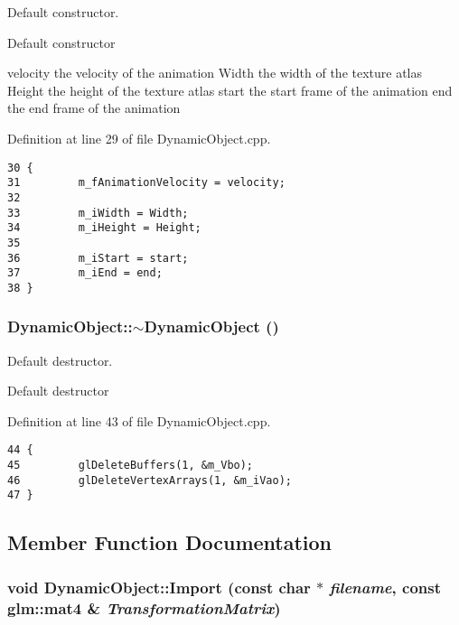Default constructor. 

Default constructor

velocity the velocity of the animation  Width the width of the texture atlas  Height the height of the texture atlas  start the start frame of the animation  end the end frame of the animation 

Definition at line 29 of file DynamicObject.cpp.

\begin{Code}\begin{verbatim}30 {
31         m_fAnimationVelocity = velocity;
32 
33         m_iWidth = Width;
34         m_iHeight = Height;
35 
36         m_iStart = start;
37         m_iEnd = end;
38 }
\end{verbatim}
\end{Code}


\hypertarget{class_dynamic_object_149b612e1f0288b115178874bd0cba93}{
\subsubsection[$\sim$DynamicObject]{\setlength{\rightskip}{0pt plus 5cm}DynamicObject::$\sim$DynamicObject ()}}
\label{class_dynamic_object_149b612e1f0288b115178874bd0cba93}


Default destructor. 

Default destructor 

Definition at line 43 of file DynamicObject.cpp.

\begin{Code}\begin{verbatim}44 {
45         glDeleteBuffers(1, &m_Vbo);
46         glDeleteVertexArrays(1, &m_iVao);
47 }
\end{verbatim}
\end{Code}




\subsection{Member Function Documentation}
\hypertarget{class_dynamic_object_051bb345c635c976355223d3e5586bf9}{
\subsubsection[Import]{\setlength{\rightskip}{0pt plus 5cm}void DynamicObject::Import (const char $\ast$ {\em filename}, \/  const {\bf glm::mat4} \& {\em TransformationMatrix})}}
\label{class_dynamic_object_051bb345c635c976355223d3e5586bf9}


